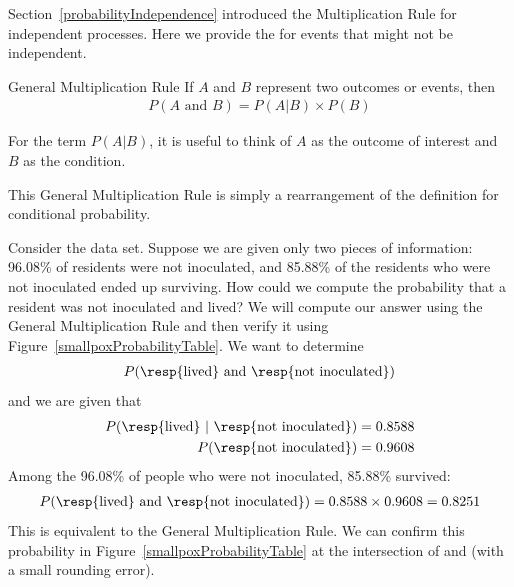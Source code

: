 Section~\ref{probabilityIndependence} introduced the Multiplication Rule for independent processes. Here we provide the  for events that might not be independent.

\begin{onebox}{General Multiplication Rule}
If $A$ and $B$ represent two outcomes or events, then \vspace{-1.5mm}
\begin{eqnarray*}
P(A\text{ and }B) = P(A | B)\times P(B)
\end{eqnarray*} \vspace{-6.5mm} \par
For the term $P(A | B)$, it is useful to think of $A$ as the outcome of interest and $B$ as the condition.\end{onebox}
This General Multiplication Rule is simply a rearrangement of the definition for conditional probability.

\begin{examplewrap}
\begin{nexample}{Consider the  data set. Suppose we are given only two pieces of information: 96.08\% of residents were not inoculated, and 85.88\% of the residents who were not inoculated ended up surviving. How could we compute the probability that a resident was not inoculated and lived?}
We will compute our answer using the General Multiplication Rule and then verify it using Figure~\ref{smallpoxProbabilityTable}. We want to determine
\begin{eqnarray*}
P(\text{\resp{lived} and \resp{not inoculated}})
\end{eqnarray*}
and we are given that
\begin{eqnarray*}
P(\text{\resp{lived}}\ |\ \text{\resp{not inoculated}})=0.8588 \\
P(\text{\resp{not inoculated}})=0.9608
\end{eqnarray*}
Among the 96.08\% of people who were not inoculated, 85.88\% survived:
\begin{eqnarray*}
P(\text{\resp{lived} and \resp{not inoculated}}) = 0.8588\times 0.9608 = 0.8251
\end{eqnarray*}
This is equivalent to the General Multiplication Rule. We can confirm this probability in Figure~\ref{smallpoxProbabilityTable} at the intersection of  and  (with a small rounding error).
\end{nexample}
\end{examplewrap}

